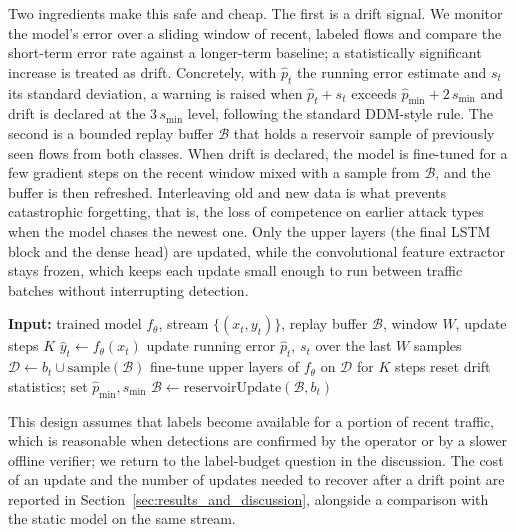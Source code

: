 \documentclass[ASNA,twocolumn]{USG} %
\begin{document}
Two ingredients make this safe and cheap. The first is a drift signal. We monitor the model's error over a sliding window of recent, labeled flows and compare the short-term error rate against a longer-term baseline; a statistically significant increase is treated as drift. Concretely, with $\hat{p}_t$ the running error estimate and $s_t$ its standard deviation, a warning is raised when $\hat{p}_t + s_t$ exceeds $\hat{p}_{\min} + 2\,s_{\min}$ and drift is declared at the $3\,s_{\min}$ level, following the standard DDM-style rule. The second is a bounded replay buffer $\mathcal{B}$ that holds a reservoir sample of previously seen flows from both classes. When drift is declared, the model is fine-tuned for a few gradient steps on the recent window mixed with a sample from $\mathcal{B}$, and the buffer is then refreshed. Interleaving old and new data is what prevents catastrophic forgetting, that is, the loss of competence on earlier attack types when the model chases the newest one. Only the upper layers (the final LSTM block and the dense head) are updated, while the convolutional feature extractor stays frozen, which keeps each update small enough to run between traffic batches without interrupting detection.

\begin{algorithm}[hbt!]
\caption{Drift-triggered incremental update}
\label{alg:drift_update}
\begin{algorithmic}[1]
\State \textbf{Input:} trained model $f_\theta$, stream $\{(x_t, y_t)\}$, replay buffer $\mathcal{B}$, window $W$, update steps $K$
  \State $\hat{y}_t \gets f_\theta(x_t)$ 
  \State update running error $\hat{p}_t$, $s_t$ over the last $W$ samples
    \State $\mathcal{D} \gets b_t \cup \text{sample}(\mathcal{B})$ 
    \State fine-tune upper layers of $f_\theta$ on $\mathcal{D}$ for $K$ steps
    \State reset drift statistics; set $\hat{p}_{\min}, s_{\min}$
  \EndIf
  \State $\mathcal{B} \gets \text{reservoirUpdate}(\mathcal{B}, b_t)$
\EndFor
\end{algorithmic}
\end{algorithm}

This design assumes that labels become available for a portion of recent traffic, which is reasonable when detections are confirmed by the operator or by a slower offline verifier; we return to the label-budget question in the discussion. The cost of an update and the number of updates needed to recover after a drift point are reported in Section~\ref{sec:results_and_discussion}, alongside a comparison with the static model on the same stream.
\end{document}
